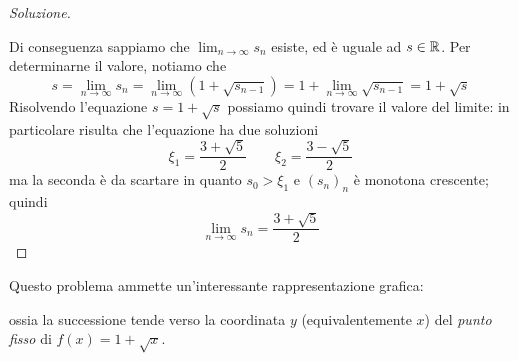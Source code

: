 \begin{proof}[Soluzione]
\begin{tcolorbox}
\begin{theorem}
            \end{theorem}
        \end{tcolorbox}
        Di conseguenza sappiamo che $\lim_{n\to\infty} s_n$ esiste, ed è uguale ad $s\in\amsbb{R}$. Per determinarne il valore, notiamo che
        \[
        s = \lim_{n\to\infty} s_n = \lim_{n\to\infty} \left(1+\sqrt{s_{n-1}}\right) = 1+\lim_{n\to\infty}\sqrt{s_{n-1}} = 1+\sqrt{s}
        \]
        Risolvendo l'equazione $s=1+\sqrt{s}$ possiamo quindi trovare il valore del limite: in particolare risulta che l'equazione ha due soluzioni
        \[
        \xi_1 = \frac{3+ \sqrt{5}}{2} \qquad \xi_2 = \frac{3-\sqrt{5}}{2}
        \]
        ma la seconda è da scartare in quanto $s_0>\xi_1$ e $(s_n)_n$ è monotona crescente; quindi
        \[
        \lim_{n\to\infty} s_n = \frac{3+\sqrt{5}}{2}
        \]
\end{proof}
\begin{remark}
    Questo problema ammette un'interessante rappresentazione grafica:
    \begin{center}
    \end{center}
    ossia la successione tende verso la coordinata $y$ (equivalentemente $x$) del \emph{punto fisso} di $f(x) = 1+\sqrt{x}$.
\end{remark}
\newpage